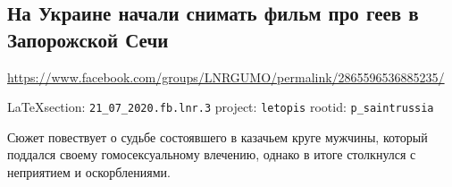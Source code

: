  
 

\subsection{На Украине начали снимать фильм про геев в Запорожской Сечи}
\label{sec:21_07_2020.fb.lnr.3}
\url{https://www.facebook.com/groups/LNRGUMO/permalink/2865596536885235/}
  
\vspace{0.5cm}
{\small\LaTeX section: \verb|21_07_2020.fb.lnr.3| project: \verb|letopis| rootid: \verb|p_saintrussia|}
\vspace{0.5cm}

Сюжет повествует о судьбе состоявшего в казачьем круге мужчины, который
поддался своему гомосексуальному влечению, однако в итоге столкнулся с
неприятием и оскорблениями.
